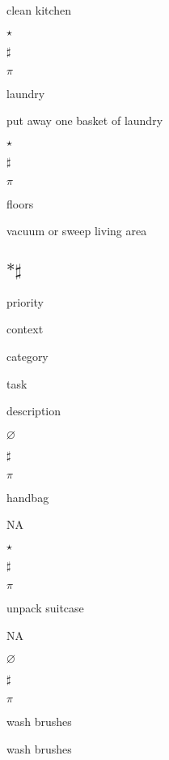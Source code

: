 \documentclass[]{book}
\newenvironment{Shaded}{\begin{snugshade}}{\end{snugshade}}
\newcommand{\KeywordTok}[1]{\textcolor[rgb]{0.13,0.29,0.53}{\textbf{#1}}}
\newcommand{\NormalTok}[1]{#1}
\newcommand{\OperatorTok}[1]{\textcolor[rgb]{0.81,0.36,0.00}{\textbf{#1}}}
\newcommand{\StringTok}[1]{\textcolor[rgb]{0.31,0.60,0.02}{#1}}
\begin{document}
clean kitchen

\(\star\)

\(\sharp\)

\(\pi\)

laundry

put away one basket of laundry

\(\star\)

\(\sharp\)

\(\pi\)

floors

vacuum or sweep living area

\hypertarget{housework}{%
\subsection{\texorpdfstring{\(* \sharp\)}{* \textbackslash{}sharp}}\label{housework}}

\begin{Shaded}
\end{Shaded}

priority

context

category

task

description

\(\varnothing\)

\(\sharp\)

\(\pi\)

handbag

NA

\(\star\)

\(\sharp\)

\(\pi\)

unpack suitcase

NA

\(\varnothing\)

\(\sharp\)

\(\pi\)

wash brushes

wash brushes
\end{document}
